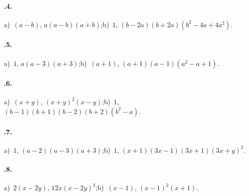 \paragraph{\thechapter.4.}
a)~$(a-b)$, $a(a-b)(a+b)$;\quad b)~$1$, $(b-2a)(b+2a)\left(b^2-4a+4a^2\right)$.

\paragraph{\thechapter.5.}
a)~$1$, $a(a-3)(a+3)$;\quad b)~$(a+1)$, $(a+1)(a-1)\left(a^2-a+1\right)$.

\paragraph{\thechapter.6.}
a)~$(x+y)$, $(x+y)^2(x-y)$;\quad b)~$1$, $(b-1)(b+1)(b-2)(b+2)\left(b^2-a\right)$.

\paragraph{\thechapter.7.}
a)~$1$, $(a-2)(a-3)(a+3)$;\quad b)~$1$, $(x+1)(3x-1)(3x+1)(3x+y)^2$.

\paragraph{\thechapter.8.}
a)~$2(x-2y)$, $12x(x-2y)^3$;\quad b)~$(x-1)$, $(x-1)^2(x+1)$.
